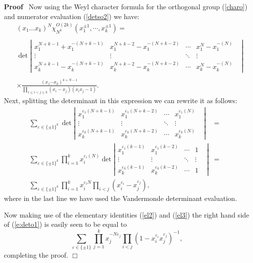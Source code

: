 \documentclass[11pt]{amsart}
\renewenvironment{proof}{
\noindent\textbf{Proof}\ }{\hspace*{\fill}
\begin{math}\Box\end{math}\medskip}
\begin{document}
\begin{proof}
  Now using the Weyl character formula for the orthogonal group (\ref{charo})
  and numerator evaluation (\ref{detso2}) we have:
  \begin{equation}\label{e:deto1}
  \begin{aligned}
&    ( x_1 \ldots x_k )^N \chi_{N^k}^{O ( 2 k )} ( x_1^{\pm 1},
\cdots,
    x_k^{\pm 1} ) = \\
    &\\
    &
    \det \left| \begin{array}{ccccc}
      x_1^{N + k - 1} + x_1^{- ( N + k - 1 )} & x_1^{N + k - 2} - x_1^{- ( N +
      k - 2 )} & \cdots & x_1^N - x_1^{- ( N )} & \\
      \vdots & \vdots & \ddots & \vdots & \\
      x_k^{N + k - 1} - x_k^{- ( N + k - 1 )} & x_k^{N + k - 2} - x_k^{- ( N +
      k - 2 )} & \cdots & x_k^N - x_k^{- ( N )} &
    \end{array} \right| \\
    &\\
    & \times \frac{( x_1 \cdots x_k )^{k + N - 1}}{\prod_{1 \leqslant i < j
    \leqslant k} ( x_i - x_j ) ( x_i x_j - 1 )} .
    \end{aligned}
  \end{equation}
  Next, splitting the determinant in this expression we can rewrite it as
  follows:
  \begin{eqnarray*}
    \sum_{\varepsilon \in \{ \pm 1 \}^k} \det \left| \begin{array}{ccccc}
      x_1^{\varepsilon_1 ( N + k - 1 )} & x_1^{\varepsilon_1 ( N + k - 2 )} &
      \cdots & x_1^{\varepsilon_1 ( N )} & \\
      \vdots & \vdots & \ddots & \vdots & \\
      x_k^{\varepsilon_k ( N + k - 1 )} & x_k^{\varepsilon_k ( N + k - 2 )} &
      \cdots & x_k^{\varepsilon_k ( N )} &
    \end{array} \right| & = & \\
    \sum_{\varepsilon \in \{ \pm 1 \}^k} \prod_{i = 1}^k x_i^{\varepsilon_i (
    N )} \det \left| \begin{array}{ccccc}
      x_1^{\varepsilon_1 ( k - 1 )} & x_1^{\varepsilon_1 ( k - 2 )} & \cdots &
      1 & \\
      \vdots & \vdots & \ddots & \vdots & \\
      x_k^{\varepsilon_k ( k - 1 )} & x_k^{\varepsilon_k ( k - 2 )} & \cdots &
      1 &
    \end{array} \right| & = & \\
    \sum_{\varepsilon \in \{ \pm 1 \}^k} \prod_{i = 1}^k x_i^{\varepsilon_i N}
    \prod_{i < j} ( x_i^{\varepsilon_i} - x_j^{\varepsilon_j} ), &  &
  \end{eqnarray*}
  where in the last line we have used the Vandermonde determinant evaluation.

  Now making use of the elementary identities (\ref{el2}) and (\ref{el3}) the
  right hand side of (\ref{e:deto1}) is easily seen to be equal to
  \[ \sum_{\varepsilon \in \{ \pm 1 \}} \prod_{j = 1}^k x_j^{- N
     \varepsilon_j} \prod_{i < j} ( 1 - x_i^{\varepsilon_i}
     x_j^{\varepsilon_j} )^{- 1}, \]
  completing the proof.
\end{proof}
\end{document}
